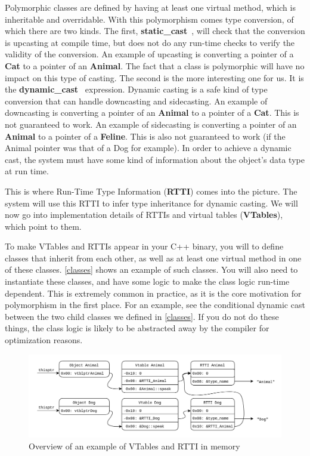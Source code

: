 \documentclass[a4paper,11pt,oneside]{report}
\begin{document}
Polymorphic classes are defined by having at least one virtual method, which is 
inheritable and overridable.
With this polymorphism comes type conversion, of which there are two kinds.
The first, \textbf{static\_cast}~\cite{staticcast}, will check that the
conversion is upcasting at compile time,
but does not do any run-time checks to verify the validity of the conversion.
An example of upcasting is converting a pointer of a \textbf{Cat} to a pointer
of an \textbf{Animal}.
The fact that a class is polymorphic will have no impact on this type of 
casting.
The second is the more interesting one for us. It is the 
\textbf{dynamic\_cast}~\cite{dynamiccast} expression.
Dynamic casting is a safe kind of type conversion that can handle downcasting 
and sidecasting.
An example of downcasting is converting a pointer of an \textbf{Animal} to a
pointer of a \textbf{Cat}. This is not guaranteed to work.
An example of sidecasting is converting a pointer of an \textbf{Animal} to a
pointer of a \textbf{Feline}. This is also not guaranteed to work (if the
Animal pointer was that of a Dog for example).
In order to achieve a dynamic cast, the system must have some kind of
information about the object's data type at run time.

This is where Run-Time Type Information (\textbf{RTTI}) comes into the picture.
The system will use this RTTI to infer type inheritance for dynamic casting.
We will now go into implementation details of RTTIs and virtual tables
(\textbf{VTables}), which point to them.

To make VTables and RTTIs appear in your C++ binary, you will to define
classes that inherit from each other, as well as at least one virtual method
in one of these classes.
\autoref{classes} shows an example of such classes.
You will also need to instantiate these classes, and have some logic to make
the class logic run-time dependent. 
This is extremely common in practice, as it is the core motivation for
polymorphism in the first place.
For an example, see the conditional dynamic cast between the two child classes
we defined in \autoref{classes}.
If you do not do these things, the class logic is likely to be abstracted away
by the compiler for optimization reasons.

\begin{figure}[h]

\includegraphics[width=16cm]{RTTI_graph.png}
\caption{Overview of an example of VTables and RTTI in memory}
\label{rttigraph}

\end{figure}
\end{document}
